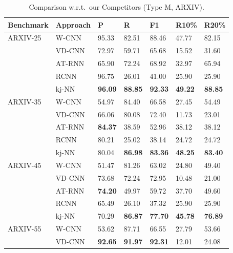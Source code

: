 \begin{table}
\renewrobustcmd{\boldmath}{}
    \centering
    \caption{Comparison w.r.t.\ our Competitors (Type M, ARXIV).}
    \label{table:arxiv_typeB}
    \addtolength{\tabcolsep}{-2pt}
    \centering
    \footnotesize
\renewcommand{\arraystretch}{0.77}
    \begin{tabularx}{\columnwidth}{XXXXXXX}
\toprule
Benchmark & Approach  & P     & R     & F1      & R10\%  & R20\%  \\ \midrule
ARXIV-25    & \gls{W-CNN}     & 95.33 &	82.51 &	88.46 &	47.77 &	82.15 	 \\
         & \gls{VD-CNN}    & 72.97 &	59.71 &	65.68 &	15.52 &	31.60 	 \\
          & \gls{AT-RNN}   & 65.90 &	72.24 &	68.92 &	32.97 &	65.94 	 \\
          & \gls{RCNN}      & 96.75 &	26.01 &	41.00 &	25.90 &	25.90 \\
          & \gls{kj-NN}     & \bfseries96.09 &	\bfseries88.85 &	\bfseries92.33 &	\bfseries49.22 &	\bfseries88.85 \\ \midrule
ARXIV-35    & \gls{W-CNN}     & 54.97 &	84.40 &	66.58 &	27.45 &	54.49 	 \\
         & \gls{VD-CNN}    & 66.06 &	80.08 &	72.40 &	11.73 &	23.01 	 \\
          & \gls{AT-RNN}   & \bfseries 84.37 &	38.59 &	52.96 &	38.12 &	38.12 	 \\
          & \gls{RCNN}      & 80.21 &	25.02 &	38.14 &	24.72 &	24.72 	 \\
          & \gls{kj-NN}     & 80.04 &	\bfseries86.98  & \bfseries83.36 & \bfseries48.25 & \bfseries83.40 \\ \midrule
ARXIV-45    & \gls{W-CNN}     & 51.47 &	81.26 &	63.02 &	24.80 &	49.40 	 \\
         & \gls{VD-CNN}    & 73.68 &	72.24 &	72.95 &	10.48 &	21.00 \\
          & \gls{AT-RNN}   & \bfseries74.20 &	49.97 &	59.72 &	37.70 &	49.60 \\
          & \gls{RCNN}      & 65.49 &	26.10 &	37.32 &	25.90 &	25.90 \\
          & \gls{kj-NN}     & 70.29 &	\bfseries86.87 &	\bfseries77.70  &	\bfseries45.78  & \bfseries 76.89 \\ \midrule
ARXIV-55    & \gls{W-CNN}     & 53.62 &	87.71 &	66.55 &	27.79 &	53.66 \\
         & \gls{VD-CNN}    & \bfseries92.65 & \bfseries91.97 &	\bfseries92.31 &	12.01 &	24.08 \\

\end{tabularx}
\end{table}
